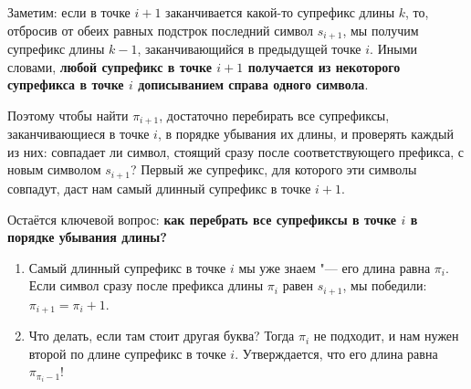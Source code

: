 \begin{center}
\end{center}

Заметим: если в точке $i + 1$ заканчивается какой-то супрефикс длины $k$, то, отбросив от обеих равных подстрок последний символ $s_{i+1}$, мы получим супрефикс длины $k - 1$, заканчивающийся в предыдущей точке $i$. Иными словами, \textbf{любой супрефикс в точке $i + 1$ получается из некоторого супрефикса в точке $i$ дописыванием справа одного символа}.

Поэтому чтобы найти $\pi_{i+1}$, достаточно перебирать все супрефиксы, заканчивающиеся в точке $i$, в порядке убывания их длины, и проверять каждый из них: совпадает ли символ, стоящий сразу после соответствующего префикса, с новым символом $s_{i+1}$? Первый же супрефикс, для которого эти символы совпадут, даст нам самый длинный супрефикс в точке $i + 1$.

Остаётся ключевой вопрос: \textbf{как перебрать все супрефиксы в точке $i$ в порядке убывания длины?}
\begin{enumerate}
    \item Самый длинный супрефикс в точке $i$ мы уже знаем "--- его длина равна $\pi_i$. Если символ сразу после префикса длины $\pi_i$ равен $s_{i+1}$, мы победили: $\pi_{i+1} = \pi_i + 1$.
    \item Что делать, если там стоит другая буква? Тогда $\pi_i$ не подходит, и нам нужен второй по длине супрефикс в точке $i$. Утверждается, что его длина равна $\pi_{\pi_i - 1}$!
\end{enumerate}

